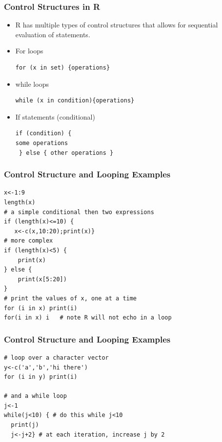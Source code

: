 \documentclass[]{article}
\theoremstyle{definition}
\theoremstyle{definition}
\theoremstyle{remark}
\begin{document}
\subsubsection{Control Structures in R}\label{control-structures-in-r}

\begin{itemize}
\item
  {R has multiple types of control structures that allows for sequential
  evaluation of statements.}
\item
  {For loops}

\begin{verbatim}
for (x in set) {operations}
\end{verbatim}
\item
  {while loops}

\begin{verbatim}
while (x in condition){operations}
\end{verbatim}
\item
  {If statements (conditional)}

\begin{verbatim}
if (condition) {
some operations 
 } else { other operations }
\end{verbatim}
\end{itemize}

\subsubsection{Control Structure and Looping
Examples}\label{control-structure-and-looping-examples}

\begin{verbatim}
x<-1:9
length(x)
# a simple conditional then two expressions
if (length(x)<=10) {
   x<-c(x,10:20);print(x)}
# more complex 
if (length(x)<5) {
    print(x)
} else {
    print(x[5:20])
}           
# print the values of x, one at a time
for (i in x) print(i) 
for(i in x) i   # note R will not echo in a loop
\end{verbatim}

\subsubsection{Control Structure and Looping
Examples}\label{control-structure-and-looping-examples-1}

\begin{verbatim}
# loop over a character vector
y<-c('a','b','hi there')            
for (i in y) print(i)

# and a while loop
j<-1                
while(j<10) { # do this while j<10      
  print(j)
  j<-j+2} # at each iteration, increase j by 2
\end{verbatim}
\end{document}
